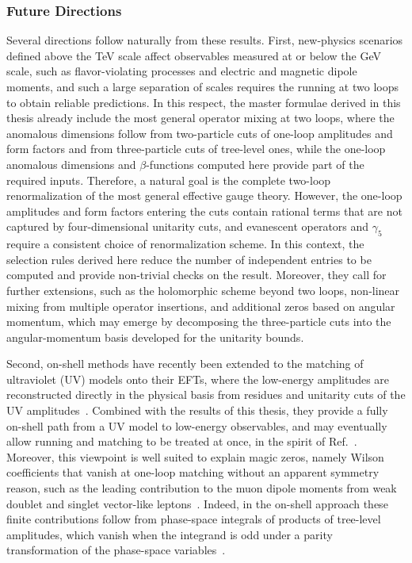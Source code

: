 \subsubsection*{Future Directions}

Several directions follow naturally from these results. First, new-physics scenarios defined above
the TeV scale affect observables measured at or below the GeV scale, such as flavor-violating
processes and electric and magnetic dipole moments, and such a large separation of scales requires
the running at two loops to obtain reliable predictions. In this respect, the master formulae
derived in this thesis already include the most general operator mixing at two loops, where the
anomalous dimensions follow from two-particle cuts of one-loop amplitudes and form factors and from
three-particle cuts of tree-level ones, while the one-loop anomalous dimensions and
$\beta$-functions computed here provide part of the required inputs. Therefore, a natural goal is
the complete two-loop renormalization of the most general effective gauge theory. However, the
one-loop amplitudes and form factors entering the cuts contain rational terms that are not captured
by four-dimensional unitarity cuts, and evanescent operators and
$\gamma_5$ require a consistent choice of renormalization scheme. In this context, the selection
rules derived here reduce the number of independent entries to be computed and provide non-trivial
checks on the result. Moreover, they call for further extensions, such as the holomorphic scheme
beyond two loops, non-linear mixing from multiple operator insertions, and additional zeros based on
angular momentum, which may emerge by decomposing the three-particle cuts into the angular-momentum
basis developed for the unitarity bounds.

Second, on-shell methods have recently been extended to the matching of ultraviolet (UV) models onto their EFTs,
where the low-energy amplitudes are reconstructed directly in the physical basis from residues and
unitarity cuts of the UV amplitudes~\cite{DeAngelis:2023bmd,Li:2023pfw,Chala:2024llp,Dong:2025wvf}.
Combined with the results of this thesis, they provide a fully on-shell path from a UV model to
low-energy observables, and may eventually allow running and matching to be treated at once, in the
spirit of Ref.~\cite{Giudice:1997ni}. Moreover, this viewpoint is well suited to explain magic
zeros, namely Wilson coefficients that vanish at one-loop matching without an apparent symmetry
reason, such as the leading contribution to the muon dipole moments from weak doublet and singlet
vector-like leptons~\cite{Arkani-Hamed:2021xlp,Craig:2021ksw}. Indeed, in the on-shell approach
these finite contributions follow from phase-space integrals of products of tree-level amplitudes,
which vanish when the integrand is odd under a parity transformation of the phase-space
variables~\cite{DelleRose:2022ygn}.

